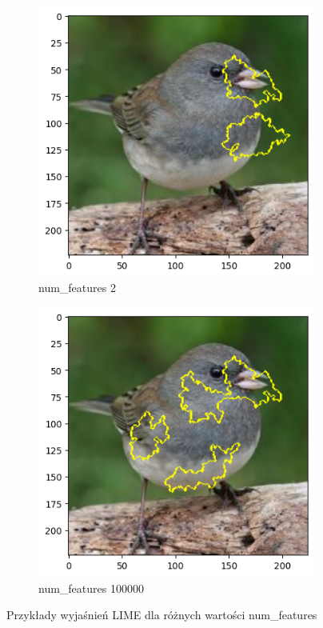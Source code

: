 \begin{figure}[h]
	\centering
	\begin{subfigure}[b]{0.3\textwidth}
		\includegraphics[width=.9\textwidth]{img/parameters/lime/num_features_2}
		\caption{num\_features 2}  \label{rys:parameters_lime_numsamples_5}
	\end{subfigure}
	\begin{subfigure}[b]{0.3\textwidth}
		\centering\includegraphics[width=.9\textwidth]{img/parameters/lime/num_features_100000}
		\caption{num\_features 100000}  \label{rys:parameters_lime_numsamples_1000}
	\end{subfigure}
	\caption{Przykłady wyjaśnień LIME dla różnych wartości num\_features}
\end{figure}

